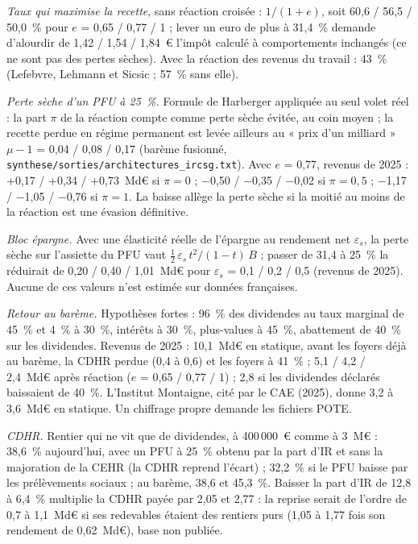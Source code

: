 \emph{Taux qui maximise la recette}, sans réaction croisée : $1/(1+e)$, soit 60,6 / 56,5 / 50,0~\% pour $e$ = 0,65 /
0,77 / 1 ; lever un euro de plus à 31,4~\% demande d'alourdir de 1,42 / 1,54 / 1,84~€ l'impôt calculé à comportements
inchangés (ce ne sont pas des pertes sèches). Avec la réaction des revenus du travail : 43~\% (Lefebvre, Lehmann et
Sicsic ; 57~\% sans elle).

\emph{Perte sèche d'un PFU à 25~\%.} Formule de Harberger appliquée au seul volet réel : la part $\pi$ de la réaction
compte comme perte sèche évitée, au coin moyen ; la recette perdue en régime permanent est levée ailleurs au « prix
d'un milliard » $\mu-1$ = 0,04 / 0,08 / 0,17 (barème fusionné, \texttt{synthese/sorties/architectures\_ircsg.txt}).
Avec $e$ = 0,77, revenus de 2025 : +0,17 / +0,34 / +0,73~Md€ si $\pi = 0$ ; $-$0,50 / $-$0,35 / $-$0,02 si
$\pi = 0{,}5$ ; $-$1,17 / $-$1,05 / $-$0,76 si $\pi = 1$. La baisse allège la perte sèche si la moitié au moins de
la réaction est une évasion définitive.

\emph{Bloc épargne.} Avec une élasticité réelle de l'épargne au rendement net $\varepsilon_s$, la perte sèche sur
l'assiette du PFU vaut $\tfrac12\,\varepsilon_s\,t^2/(1-t)\,B$ ; passer de 31,4 à 25~\% la réduirait de 0,20 / 0,40 /
1,01~Md€ pour $\varepsilon_s$ = 0,1 / 0,2 / 0,5 (revenus de 2025). Aucune de ces valeurs n'est estimée sur données
françaises.

\emph{Retour au barème.} Hypothèses fortes : 96~\% des dividendes au taux marginal de 45~\% et 4~\% à 30~\%, intérêts
à 30~\%, plus-values à 45~\%, abattement de 40~\% sur les dividendes. Revenus de 2025 : 10,1~Md€ en statique, avant
les foyers déjà au barème, la CDHR perdue (0,4 à 0,6) et les foyers à 41~\% ; 5,1 / 4,2 / 2,4~Md€ après réaction
($e$ = 0,65 / 0,77 / 1) ; 2,8 si les dividendes déclarés baissaient de 40~\%. L'Institut Montaigne, cité par le CAE
(2025), donne 3,2 à 3,6~Md€ en statique. Un chiffrage propre demande les fichiers POTE.

\emph{CDHR.} Rentier qui ne vit que de dividendes, à 400\,000~€ comme à 3~M€ : 38,6~\% aujourd'hui, avec un PFU à
25~\% obtenu par la part d'IR et sans la majoration de la CEHR (la CDHR reprend l'écart) ; 32,2~\% si le PFU baisse
par les prélèvements sociaux ; au barème, 38,6 et 45,3~\%. Baisser la part d'IR de 12,8 à 6,4~\% multiplie la CDHR payée par 2,05 et 2,77 : la reprise serait de l'ordre de 0,7 à 1,1~Md€ si ses
redevables étaient des rentiers purs (1,05 à 1,77 fois son rendement de 0,62~Md€), base non publiée.

